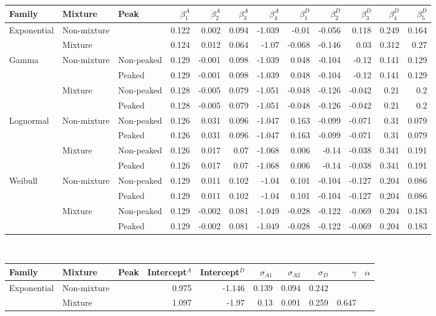 \documentclass[useAMS,usenatbib,referee,12pt]{article}
\begin{document}
\begin{table}\footnotesize
\centering
\begin{tabular}{lll|rrrr|rrrrr}
  \hline
Family & Mixture & Peak & $\beta^A_1$ & $\beta^A_2$ & $\beta^A_3$ & $\beta^A_4$ & $\beta^D_1$ & $\beta^D_2$ & $\beta^D_3$ & $\beta^D_4$ & $\beta^D_5$  \\
  \hline
Exponential & Non-mixture & &0.122&0.002&0.094&-1.039&-0.01&-0.056&0.118&0.249&0.164 \\
& Mixture & &0.124&0.012&0.064&-1.07&-0.068&-0.146&0.03&0.312&0.27 \\
Gamma & Non-mixture & Non-peaked &0.129&-0.001&0.098&-1.039&0.048&-0.104&-0.12&0.141&0.129 \\
& & Peaked &0.129&-0.001&0.098&-1.039&0.048&-0.104&-0.12&0.141&0.129 \\
& Mixture & Non-peaked &0.128&-0.005&0.079&-1.051&-0.048&-0.126&-0.042&0.21&0.2 \\
& & Peaked &0.128&-0.005&0.079&-1.051&-0.048&-0.126&-0.042&0.21&0.2 \\
Lognormal & Non-mixture & Non-peaked &0.126&0.031&0.096&-1.047&0.163&-0.099&-0.071&0.31&0.079 \\
& & Peaked &0.126&0.031&0.096&-1.047&0.163&-0.099&-0.071&0.31&0.079 \\
& Mixture & Non-peaked &0.126&0.017&0.07&-1.068&0.006&-0.14&-0.038&0.341&0.191 \\
& & Peaked &0.126&0.017&0.07&-1.068&0.006&-0.14&-0.038&0.341&0.191 \\
Weibull & Non-mixture & Non-peaked &0.129&0.011&0.102&-1.04&0.101&-0.104&-0.127&0.204&0.086 \\
& & Peaked &0.129&0.011&0.102&-1.04&0.101&-0.104&-0.127&0.204&0.086 \\
& Mixture & Non-peaked &0.129&-0.002&0.081&-1.049&-0.028&-0.122&-0.069&0.204&0.183 \\
& & Peaked &0.129&-0.002&0.081&-1.049&-0.028&-0.122&-0.069&0.204&0.183 \\
  \hline
\end{tabular}\\
\vspace{1.25cm}
\begin{tabular}{ll|lrrrrrrr}
  \hline
Family & Mixture & Peak & Intercept$^A$ & Intercept$^D$ & $\sigma_{A1}$ & $\sigma_{A2}$ & $\sigma_D$ & $\gamma$ & $\alpha$ \\
\hline
Exponential & Non-mixture & &0.975&-1.146&0.139&0.094&0.242& & \\
& Mixture & &1.097&-1.97&0.13&0.091&0.259&0.647& \\

\end{tabular}
\end{table}
\end{document}
